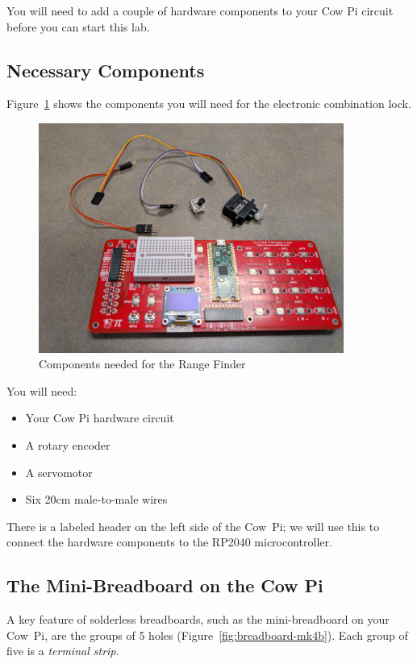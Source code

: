 You will need to add a couple of hardware components to your Cow Pi circuit before you can start this lab.

\subsection{Necessary Components}

Figure~\ref{fig:components-mk4b} shows the components you will need for the electronic combination lock.

\begin{figure}
    \centering
    \includegraphics[width=10cm]{hardware/components}
    \caption{Components needed for the Range Finder \label{fig:components-mk4b}}
\end{figure}

You will need:
\begin{itemize}
    \item Your Cow Pi hardware circuit
    \item A rotary encoder
    \item A servomotor
    \item Six 20cm male-to-male wires
\end{itemize}

There is a labeled header on the left side of the Cow~Pi;
we will use this to connect the hardware components to the RP2040 microcontroller.

\subsection{The Mini-Breadboard on the Cow Pi}

A key feature of solderless breadboards, such as the mini-breadboard on your Cow~Pi, are the groups of 5 holes (Figure~\ref{fig:breadboard-mk4b}).
Each group of five is a \textit{terminal strip}.

